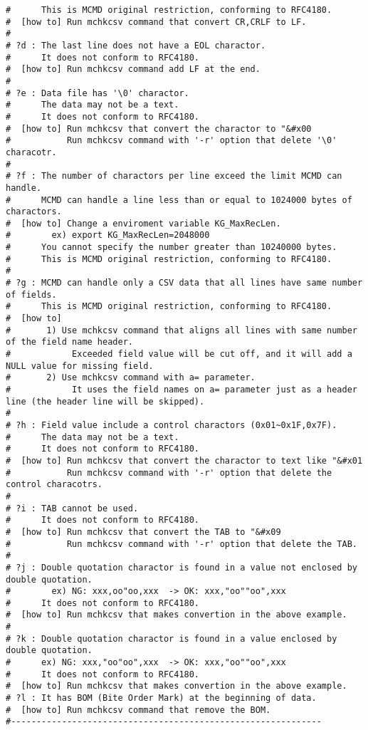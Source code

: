 \begin{Verbatim}[baselinestretch=0.7,frame=single]
#      This is MCMD original restriction, conforming to RFC4180.
#  [how to] Run mchkcsv command that convert CR,CRLF to LF.
#
# ?d : The last line does not have a EOL charactor.
#      It does not conform to RFC4180.
#  [how to] Run mchkcsv command add LF at the end.
#
# ?e : Data file has '\0' charactor.
#      The data may not be a text.
#      It does not conform to RFC4180.
#  [how to] Run mchkcsv that convert the charactor to "&#x00
#           Run mchkcsv command with '-r' option that delete '\0' characotr.
#
# ?f : The number of charactors per line exceed the limit MCMD can handle.
#      MCMD can handle a line less than or equal to 1024000 bytes of charactors.
#  [how to] Change a enviroment variable KG_MaxRecLen.
#        ex) export KG_MaxRecLen=2048000
#      You cannot specify the number greater than 10240000 bytes.
#      This is MCMD original restriction, conforming to RFC4180.
#
# ?g : MCMD can handle only a CSV data that all lines have same number of fields.
#      This is MCMD original restriction, conforming to RFC4180.
#  [how to]
#       1) Use mchkcsv command that aligns all lines with same number of the field name header.
#            Exceeded field value will be cut off, and it will add a NULL value for missing field.
#       2) Use mchkcsv command with a= parameter.
#            It uses the field names on a= parameter just as a header line (the header line will be skipped).
#
# ?h : Field value include a control charactors (0x01~0x1F,0x7F).
#      The data may not be a text.
#      It does not conform to RFC4180.
#  [how to] Run mchkcsv that convert the charactor to text like "&#x01
#           Run mchkcsv command with '-r' option that delete the control characotrs.
#
# ?i : TAB cannot be used.
#      It does not conform to RFC4180.
#  [how to] Run mchkcsv that convert the TAB to "&#x09
#           Run mchkcsv command with '-r' option that delete the TAB.
#
# ?j : Double quotation charactor is found in a value not enclosed by double quotation.
#        ex) NG: xxx,oo"oo,xxx  -> OK: xxx,"oo""oo",xxx
#      It does not conform to RFC4180.
#  [how to] Run mchkcsv that makes convertion in the above example.
#
# ?k : Double quotation charactor is found in a value enclosed by double quotation.
#      ex) NG: xxx,"oo"oo",xxx  -> OK: xxx,"oo""oo",xxx
#      It does not conform to RFC4180.
#  [how to] Run mchkcsv that makes convertion in the above example.
# ?l : It has BOM (Bite Order Mark) at the beginning of data.
#  [how to] Run mchkcsv command that remove the BOM.
#-------------------------------------------------------------
\end{Verbatim}

